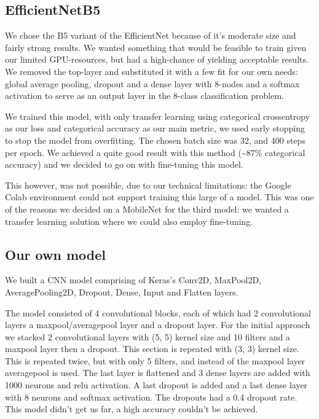 \documentclass[twocolumn]{article}
\begin{document}
	\subsection{EfficientNetB5}
	
	We chose the B5 variant of the EfficientNet because of it's moderate size and fairly strong results. We wanted something that would be feasible to train given our limited GPU-resources, but had a high-chance of yielding acceptable results. We removed the top-layer and substituted it with a few fit for our own needs: global average pooling, dropout and a dense layer with 8-nodes and a softmax activation to serve as an output layer in the 8-class classification problem.
	
	We trained this model, with only transfer learning using categorical crossentropy as our loss and categorical accuracy as our main metric, we used early stopping to stop the model from overfitting. The chosen batch size was 32, and 400 steps per epoch. We achieved a quite good result with this method (\textasciitilde87\% categorical accuracy) and we decided to go on with fine-tuning this model. 
	
	This however, was not possible, due to our technical limitations: the Google Colab environment could not support training this large of a model. This was one of the reasons we decided on a MobileNet for the third model: we wanted a transfer learning solution where we could also employ fine-tuning. 
	
	\subsection{Our own model}
	We built a CNN model comprising of Keras's Conv2D, MaxPool2D, AveragePooling2D, Dropout, Dense, Input and Flatten layers.
	
	The model consisted of 4 convolutional blocks, each of which had 2 convolutional layers a maxpool/averagepool layer and a dropout layer.
	For the initial approach we stacked 2 convolutional layers with (5, 5) kernel size and 10 filters and a maxpool layer then a dropout. This section is repeated with (3, 3) kernel size. This is repeated twice, but with only 5 filters, and instead of the maxpool layer averagepool is used. The last layer is flattened and 3 dense layers are added with 1000 neurons and relu activation. A last dropout is added and a last dense layer with 8 neurons and softmax activation.
	The dropouts had a 0.4 dropout rate.
	This model didn't get us far, a high accuracy couldn't be achieved.
	
\end{document}
